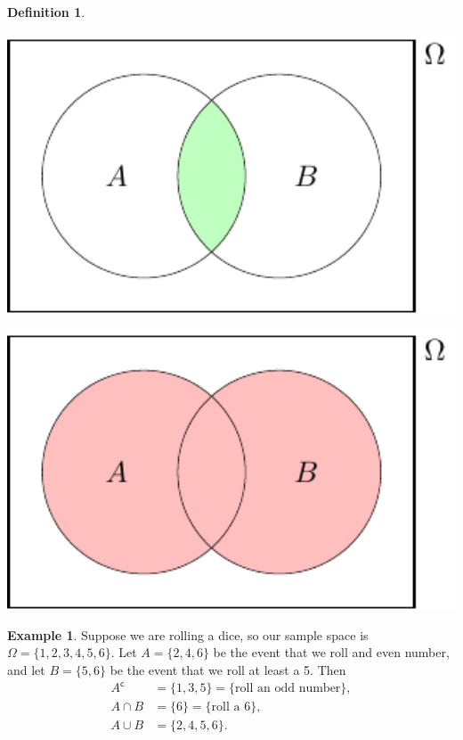 \documentclass[
  a4paper,
]{book}
\theoremstyle{definition}
\newtheorem{definition}{Definition}[chapter]
\theoremstyle{definition}
\newtheorem{example}{Example}[chapter]
\theoremstyle{definition}
\theoremstyle{definition}
\theoremstyle{remark}
\begin{document}
\begin{definition}
\begin{center}\includegraphics[width=550pt]{math1710_files/figure-latex/venn-and-1} \end{center}

\begin{center}\includegraphics[width=550pt]{math1710_files/figure-latex/venn-or-1} \end{center}

\end{definition}

\begin{example}
Suppose we are rolling a dice, so our sample space is \(\Omega = \{1,2,3,4,5,6\}\). Let \(A = \{2,4,6\}\) be the event that we roll and even number, and let \(B = \{5,6\}\) be the event that we roll at least a 5. Then
\begin{align*}
A^\mathsf{c}&= \{1,3,5\} = \{\text{roll an odd number}\} ,\\
A \cap B &= \{6\} = \{\text{roll a 6}\} ,\\
A \cup B &= \{2,4,5,6\} .
\end{align*}
\end{example}
\end{document}
